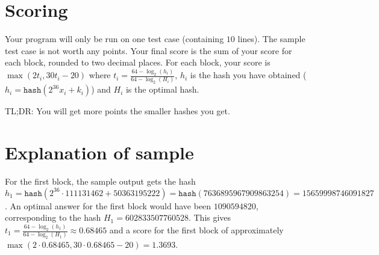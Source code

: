 \section*{Scoring}

Your program will only be run on one test case (containing $10$ lines). The
sample test case is not worth any points. Your final score is the sum of your
score for each block, rounded to two decimal places. For each block, your score
is $\max(2t_i, 30t_i-20)$ where $t_i = \frac{64-\log_2(h_i)}{64-\log_2(H_i)}$,
$h_i$ is the hash you have obtained ($h_i = \texttt{hash}(2^{36} x_i + k_i)$)
and $H_i$ is the optimal hash.

TL;DR: You will get more points the smaller hashes you get.

\section*{Explanation of sample}
For the first block, the sample output gets the hash $h_1 = \texttt{hash}(2^{36}
\cdot 111131462 + 50363195222) = \texttt{hash}(7636895967909863254) =
15659998746091827$.  An optimal answer for the first block would have been
$1090594820$, corresponding to the hash $H_1 = 602833507760528$.  This gives
$t_1 = \frac{64-\log_2(h_1)}{64-\log_2(H_1)} \approx 0.68465$ and a score for
the first block of approximately $\max(2 \cdot 0.68465, 30 \cdot 0.68465-20) =
1.3693$.
